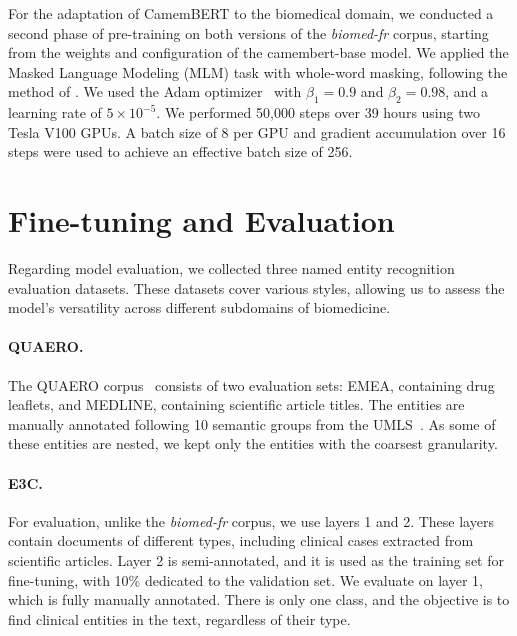 \begin{reviewread}
For the adaptation of CamemBERT to the biomedical domain, we conducted a second phase of pre-training on both versions of the \textit{biomed-fr} corpus, starting from the weights and configuration of the camembert-base model. We applied the Masked Language Modeling (MLM) task with whole-word masking, following the method of \citet{martin-etal-2020-camembert}. We used the Adam optimizer~\citep{kingma_adam_2017} with $\beta_1 = 0.9$ and $\beta_2 = 0.98$, and a learning rate of $5 \times 10^{-5}$. We performed 50,000 steps over 39 hours using two Tesla V100 GPUs. A batch size of 8 per GPU and gradient accumulation over 16 steps were used to achieve an effective batch size of 256.
\end{reviewread}


\section{Fine-tuning and Evaluation}

\begin{reviewread}
Regarding model evaluation, we collected three named entity recognition evaluation datasets. These datasets cover various styles, allowing us to assess the model's versatility across different subdomains of biomedicine.
\end{reviewread}

\paragraph{QUAERO.} The QUAERO corpus~\citep{neveol14quaero} consists of two evaluation sets: EMEA, containing drug leaflets, and MEDLINE, containing scientific article titles. The entities are manually annotated following 10 semantic groups from the UMLS~\citep{lindberg_unified_1993}. As some of these entities are nested, we kept only the entities with the coarsest granularity.

\paragraph{E3C.} For evaluation, unlike the \textit{biomed-fr} corpus, we use layers 1 and 2. These layers contain documents of different types, including clinical cases extracted from scientific articles. Layer 2 is semi-annotated, and it is used as the training set for fine-tuning, with 10\% dedicated to the validation set. We evaluate on layer 1, which is fully manually annotated. There is only one class, and the objective is to find clinical entities in the text, regardless of their type.

